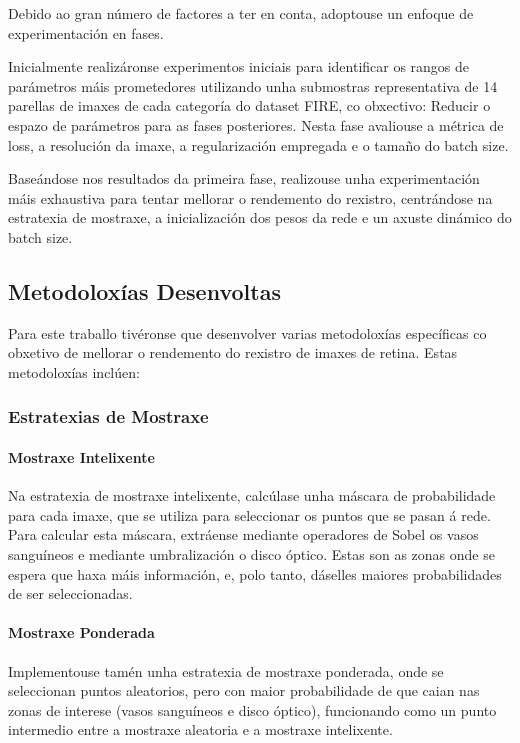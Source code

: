 Debido ao gran número de factores a ter en conta, adoptouse un enfoque de experimentación en fases.

Inicialmente realizáronse experimentos iniciais para identificar os rangos de parámetros máis prometedores utilizando unha submostras representativa de 14 parellas de imaxes de cada categoría do dataset FIRE, co obxectivo: Reducir o espazo de parámetros para as fases posteriores.
Nesta fase avaliouse a métrica de loss, a resolución da imaxe, a regularización empregada e o tamaño do batch size.

Baseándose nos resultados da primeira fase, realizouse unha experimentación máis exhaustiva para tentar mellorar o rendemento do rexistro, centrándose na estratexia de mostraxe, a inicialización dos pesos da rede e un axuste dinámico do batch size.

\subsection{Metodoloxías Desenvoltas}
\label{subsec:Metodoloxías Desenvoltas}

Para este traballo tivéronse que desenvolver varias metodoloxías específicas co obxetivo de mellorar o rendemento do rexistro de imaxes de retina. Estas metodoloxías inclúen:

\subsubsection{Estratexias de Mostraxe}
\label{subsubsec:estratexias_mostraxe}

\paragraph{Mostraxe Intelixente}
Na estratexia de mostraxe intelixente, calcúlase unha máscara de probabilidade para cada imaxe, que se utiliza para seleccionar os puntos que se pasan á rede. Para calcular esta máscara, extráense mediante operadores de Sobel os vasos sanguíneos e mediante umbralización o disco óptico. Estas son as zonas onde se espera que haxa máis información, e, polo tanto, dáselles maiores probabilidades de ser seleccionadas.

\paragraph{Mostraxe Ponderada}
Implementouse tamén unha estratexia de mostraxe ponderada, onde se seleccionan puntos aleatorios, pero con maior probabilidade de que caian nas zonas de interese (vasos sanguíneos e disco óptico), funcionando como un punto intermedio entre a mostraxe aleatoria e a mostraxe intelixente. 

